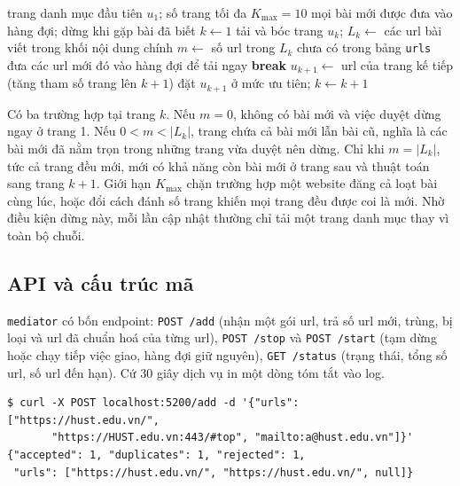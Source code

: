 \documentclass[12pt,a4paper]{report}
\begin{document}
\begin{algorithm}[ht]
\caption{Tải bài mới theo trang danh mục}\label{alg:incremental}
\begin{algorithmic}[1]
\Require trang danh mục đầu tiên $u_1$; số trang tối đa $K_{\max} = 10$
\Ensure mọi bài mới được đưa vào hàng đợi; dừng khi gặp bài đã biết
\State $k \gets 1$
  \State tải và bóc trang $u_k$; $L_k \gets$ các url bài viết trong khối nội dung chính
  \State $m \gets$ số url trong $L_k$ chưa có trong bảng \texttt{urls}
  \State đưa các url mới đó vào hàng đợi để tải ngay
   \State \textbf{break} 
  \EndIf
  \State $u_{k+1} \gets$ url của trang kế tiếp (tăng tham số trang lên $k+1$)
  \State đặt $u_{k+1}$ ở mức ưu tiên; $k \gets k + 1$
\EndWhile
\end{algorithmic}
\end{algorithm}

Có ba trường hợp tại trang $k$. Nếu $m = 0$, không có bài mới và việc duyệt dừng ngay ở trang 1. Nếu $0 < m < |L_k|$,
trang chứa cả bài mới lẫn bài cũ, nghĩa là các bài mới đã nằm trọn trong những trang vừa duyệt nên dừng. Chỉ khi
$m = |L_k|$, tức cả trang đều mới, mới có khả năng còn bài mới ở trang sau và thuật toán sang trang $k+1$. Giới hạn
$K_{\max}$ chặn trường hợp một website đăng cả loạt bài cùng lúc, hoặc đổi cách đánh số trang khiến mọi trang đều
được coi là mới. Nhờ điều kiện dừng này, mỗi lần cập nhật thường chỉ tải một trang danh mục thay vì toàn bộ chuỗi.

\subsection{API và cấu trúc mã}

\texttt{mediator} có bốn endpoint: \texttt{POST /add} (nhận một gói url, trả số url mới, trùng, bị loại và url đã
chuẩn hoá của từng url), \texttt{POST /stop} và \texttt{POST /start} (tạm dừng hoặc chạy tiếp việc giao, hàng đợi giữ
nguyên), \texttt{GET /status} (trạng thái, tổng số url, số url đến hạn). Cứ 30 giây dịch vụ in một dòng tóm tắt vào log.

\begin{lstlisting}[caption={Ví dụ gọi POST /add}]
$ curl -X POST localhost:5200/add -d '{"urls": ["https://hust.edu.vn/",
       "https://HUST.edu.vn:443/#top", "mailto:a@hust.edu.vn"]}'
{"accepted": 1, "duplicates": 1, "rejected": 1,
 "urls": ["https://hust.edu.vn/", "https://hust.edu.vn/", null]}
\end{lstlisting}
\end{document}
